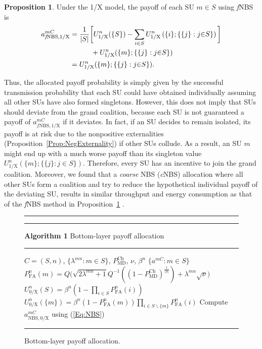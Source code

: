 \documentclass[journal,draftclsnofoot,onecolumn]{IEEEtran}
\theoremstyle{definition}
\newtheorem{Prop}{Proposition}
\def\Extra{0.5ex}
\def\Extra{0.5ex}
\begin{document}
\begin{Prop} \label{Prop:fNBS}Under the 1/X model, the payoff of each SU $m\in S$ using \textit{f}NBS is \cite{NBSNeg}
\begin{align}\label{Eq:fNBS}
a_{{\mathrm{\textit{f}NBS,1/X}}}^{mC}&=\frac{1 }{|S|}\bigg[U_\mathrm{1/X}^n(\{ S\} ) - \smashoperator{\sum\limits_{i \in S}} U_\mathrm{1/X}^n\left(\{ i\} ;\{ \{ j\} :{j {\in} S}\} \right)\bigg]\notag\\
&\quad\quad\quad+U_\mathrm{1/X}^n (\{ m\} ;\{ \{ j\} :{j {\in} S}\})\notag\\
&= U_\mathrm{1/X}^n(\{ m\} ; \{ \{ j\} :{j {\in} S}\} ).
\end{align}
\end{Prop}
Thus, the allocated payoff probability is simply given by the successful transmission probability that each SU could have obtained individually assuming all other SUs have also formed singletons. However, this does not imply that SUs should deviate from the grand coalition, because each SU is not guaranteed a payoff of $ a_{{\mathrm{\textit{f}NBS,1/X}}}^{mC}$ if it deviates. In fact, if an SU decides to remain isolated, its payoff is at risk due to the nonpositive externalities (Proposition~\ref{Prop:NegExternality}) if other SUs collude. As a result, an SU $m$ might end up with a much worse payoff than its singleton value $U_\mathrm{1/X}^n(\{ m\} {;}{ \{ \{ j\} :{j {\in} S}\}})$. Therefore, every SU has an incentive to join the grand coalition. Moreover, we found that a \textit{coarse} NBS (\textit{c}NBS) \cite{NBSNeg} allocation where all other SUs form a coalition and try to reduce the hypothetical individual payoff of the deviating SU, results in similar throughput and energy consumption as that of the \textit{f}NBS method in Proposition~\ref{Prop:fNBS} \cite{YLuThesis}.

\renewcommand{\algorithmicrequire}{\textbf{Input:}}
\renewcommand{\algorithmicensure}{\textbf{Output:}}
\begin{figure}[!t]

\hrule\hrule\vspace{\Extra}
\textbf{Algorithm 1} Bottom-layer payoff allocation
\vspace{\Extra}
\hrule
\begin{algorithmic}[1]
\Require $C{=}(S,n)$, $\{\lambda^{mn}:m{\in}S\}$, $P_\mathrm{MD}^\mathrm{Ch}$, $\nu$, $\beta^n$
\Ensure $\{a^{mC}:m{\in}S\}$
\State $P^n_\mathrm{FA}(m){=}Q\Big(\sqrt{2\lambda^{mn}{+}1}Q^{-1}((1-P_\mathrm{MD}^\mathrm{Ch})^\frac{1}{\left | S \right |}){+}\lambda^{mn}\sqrt{\nu}\Big)$\label{Line:AdaptTh}
\State $U_\mathrm{0/X}^n(S)=\beta^n(1-\prod_{i{\in}S}P_\mathrm{FA}^n(i))$
\State $U_\mathrm{0/X}^n(\{m\}){=}\beta^n(1-P_\mathrm{FA}^n(m))\prod _{i\in S\backslash\{m\}}P_\mathrm{FA}^n(i)$ 
\State Compute $a^{mC}_\mathrm{NBS,0/X}$ using  (\ref{Eq:NBS})
\EndIf
{}
\EndIf
\end{algorithmic}
\hrule
\caption{Bottom-layer payoff allocation.}
\label{Fig:AlgBottom}
\end{figure}
\end{document}

